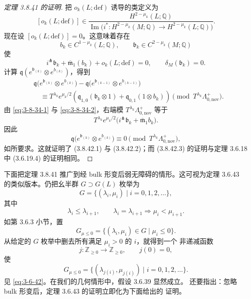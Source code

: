 \begin{proof}[定理 3.8.41 的证明]
把 $o_k(L;\mathrm{def})$ 诱导的类定义为
\[
 [o_k(L;\mathrm{def})]
 \in
 \frac{H^{2-\mu_k}(L;\mathbb Q)}
 {\operatorname{Im}\bigl(
 i^*\colon H^{2-\mu_k}(M;\mathbb Q)
 \longrightarrow H^{2-\mu_k}(L;\mathbb Q)
 \bigr)}.
\]
现在设 $[o_k(L;\mathrm{def})]=0$。这意味着存在
\[
 b_k\in C^{1-\mu_k}(L;\mathbb Q),
 \qquad
 \mathfrak b_k\in C^{2-\mu_k}(M;\mathbb Q)
\]
使
\begin{equation}
 i^\pitchfork\mathfrak b_k
 +\overline{\mathfrak m}_1(b_k)
 +o_k(L;\mathrm{def})=0,
 \qquad
 \delta_M(\mathfrak b_k)=0.
\tag{3.8.47}\label{eq:3-8-47}
\end{equation}
计算
$\mathfrak q(e^{\mathfrak b_{(k)}}\otimes e^{b_{(k)}})$，得到
\begin{equation}
\begin{aligned}
&\mathfrak q\bigl(
 e^{\mathfrak b_{(k)}}\otimes e^{b_{(k)}}
 \bigr)
 -
 \mathfrak q\bigl(
 e^{\mathfrak b_{(k-1)}}\otimes e^{b_{(k-1)}}
 \bigr)\\
&\quad\equiv
T^{\lambda_k}e^{\mu_k/2}
\left(
 \mathfrak q_{1,0}(\mathfrak b_k\otimes1)
 +\mathfrak q_{0,1}(1\otimes b_k)
\right)
\pmod{T^{\lambda_k}\Lambda^+_{0,\mathrm{nov}}}.
\end{aligned}
\tag{3.8.48}\label{eq:3-8-48}
\end{equation}
由 \eqref{eq:3-8-34-1} 与 \eqref{eq:3-8-34-2}，右端模
$T^{\lambda_k}\Lambda^+_{0,\mathrm{nov}}$ 等于
\[
 T^{\lambda_k}e^{\mu_k/2}
 \bigl(
 i^\pitchfork\mathfrak b_k
 +\overline{\mathfrak m}_1b_k
 \bigr).
\]
因此
\begin{equation}
 \mathfrak q\bigl(
 e^{\mathfrak b_{(k)}}\otimes e^{b_{(k)}}
 \bigr)
 \equiv0
 \pmod{T^{\lambda_k}\Lambda^+_{0,\mathrm{nov}}},
\tag{3.8.49}\label{eq:3-8-49}
\end{equation}
如所要求。这就证明了 (3.8.42.1) 与 (3.8.42.2)；而
(3.8.42.3) 的证明与定理 3.6.18 中 (3.6.19.4) 的证明相同。
\end{proof}
下面把定理 3.8.41 推广到经 bulk 形变后弱无障碍的情形。这可视为定理
3.6.43 的类似版本。仍把幺半群 $G\supset G(L)$ 枚举为
\[
 G=\{(\lambda_i,\mu_i)\mid i=0,1,2,\ldots\},
\]
其中
\[
 \lambda_i\leq\lambda_{i+1},
 \qquad
 \lambda_i=\lambda_{i+1}\Longrightarrow\mu_i<\mu_{i+1}.
\]
如第 3.6.3 小节，置
\[
 G_{\mu\leq0}
 =
 \{(\lambda_i,\mu_i)\in G\mid\mu_i\leq0\}.
\]
从给定的 $G$ 枚举中删去所有满足 $\mu_i>0$ 的 $i$，就得到一个
非递减函数
\[
 j\colon\mathbb Z_{\geq0}\longrightarrow\mathbb Z_{\geq0},
 \qquad j(0)=0,
\]
使
\[
 G_{\mu\leq0}
 =
 \{(\lambda_{j(i)},\mu_{j(i)})\mid i=0,1,2,\ldots\}.
\]
见 \eqref{eq:3-6-42}。在我们的几何情形中，假设 3.6.39 显然成立。
还要指出：忽略 bulk 形变后，定理 3.6.43 的证明立即化为下面给出的
证明。

